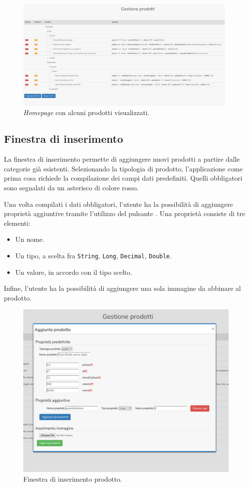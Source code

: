 		\begin{figure}[H]
			\centering
			\includegraphics[width=11cm]{immagini/homepage-view-product}
			\caption{\textit{Homepage} con alcuni prodotti visualizzati.}
		\end{figure}
	
	\subsection{Finestra di inserimento}
		La finestra di inserimento permette di aggiungere nuovi prodotti a partire dalle categorie già esistenti. Selezionando la tipologia di prodotto, l'applicazione come prima cosa richiede la compilazione dei campi dati predefiniti. Quelli obbligatori sono segnalati da un asterisco di colore rosso.
		
		Una volta compilati i dati obbligatori, l'utente ha la possibilità di aggiungere proprietà aggiuntive tramite l'utilizzo del pulsante . Una proprietà consiste di tre elementi:
		\begin{itemize}
			\item Un nome.
			\item Un tipo, a scelta fra \texttt{String}, \texttt{Long}, \texttt{Decimal}, \texttt{Double}.
			\item Un valore, in accordo con il tipo scelto.
		\end{itemize}
		Infine, l'utente ha la possibilità di aggiungere una sola immagine da abbinare al prodotto.
		
		\begin{figure}[H]
			\centering
			\includegraphics[width=\textwidth]{immagini/add-page}
			\caption{Finestra di inserimento prodotto.}
		\end{figure}
	
